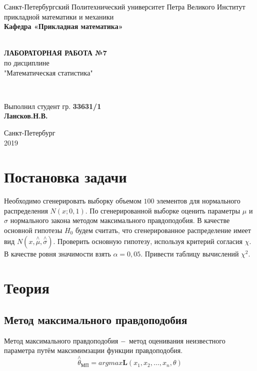 \documentclass[12pt]{article}
\renewcommand{\listoffigures}{\begingroup  %
\tocsection
\tocfile{\listfigurename}{lof}
\endgroup}
\renewcommand{\listoftables}{\begingroup  %
\tocsection
\tocfile{\listtablename}{lot}
\endgroup}
\begin{document}
\begin{titlepage}
	\center
		Санкт-Петербургский Политехнический 
		университет Петра Великого
		Институт прикладной математики и механики
		\\ \textbf{Кафедра «Прикладная математика»}

	\vfill ~
	\textbf{
		\\ \large ЛАБОРАТОРНАЯ РАБОТА №7
	}
	\\	по дисциплине 
	\\	"Математическая статистика"

	\vfill ~

	Выполнил студент гр. \textbf{33631/1} \\
	\textbf{Лансков.Н.В.} \\ 

\vfill

{\large}	Санкт-Петербург
\\ 2019
\end{titlepage}


\tableofcontents 
\newpage
\listoftables
\newpage

\section{Постановка задачи}

Необходимо сгенерировать выборку объемом $100$ элементов для нормального распределения $N(x;0,1).$ По сгенерированной выборке оценить параметры $\mu$ и $\sigma$ нормального закона методом максимального правдоподобия. В качестве основной гипотезы $H_0$ будем считать, что сгенерированное распределение имеет вид $N(x,\overset{\wedge}{\mu},\overset{\wedge}{\sigma} ).$ Проверить основную гипотезу, используя критерий согласия $\chi$. В качестве ровня значимости взять $\alpha=0,05.$ Привести таблицу вычислений $\chi^2.$


\section{Теория}
\subsection{Метод максимального правдоподобия}
Метод максимального правдоподобия $\--$ метод оценивания неизвестного параметра путём максимимзации функции правдоподобия.
\begin{equation}
    \overset{\wedge}{\theta}_{\text{МП}}=argmax \mathbf{L}(x_1,x_2,\ldots,x_n,\theta)
\end{equation}
\end{document}
